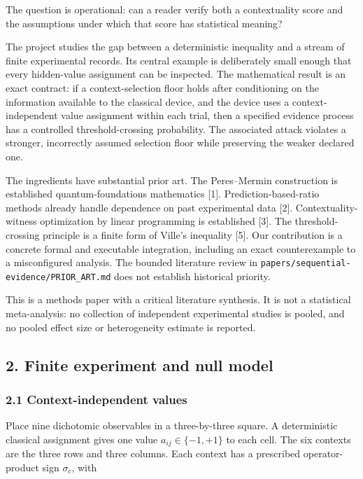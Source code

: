 \documentclass[10pt,a4paper]{article}
\begin{document}
The question is operational: can a reader verify both a contextuality
score and the assumptions under which that score has statistical
meaning?

The project studies the gap between a deterministic inequality and a
stream of finite experimental records. Its central example is
deliberately small enough that every hidden-value assignment can be
inspected. The mathematical result is an exact contract: if a
context-selection floor holds after conditioning on the information
available to the classical device, and the device uses a
context-independent value assignment within each trial, then a specified
evidence process has a controlled threshold-crossing probability. The
associated attack violates a stronger, incorrectly assumed selection
floor while preserving the weaker declared one.

The ingredients have substantial prior art. The Peres--Mermin
construction is established quantum-foundations mathematics {[}1{]}.
Prediction-based-ratio methods already handle dependence on past
experimental data {[}2{]}. Contextuality-witness optimization by linear
programming is established {[}3{]}. The threshold-crossing principle is
a finite form of Ville's inequality {[}5{]}. Our contribution is a
concrete formal and executable integration, including an exact
counterexample to a misconfigured analysis. The bounded literature
review in \texttt{papers/sequential-evidence/PRIOR\_ART.md} does not establish historical
priority.

This is a methods paper with a critical literature synthesis. It is not
a statistical meta-analysis: no collection of independent experimental
studies is pooled, and no pooled effect size or heterogeneity estimate
is reported.

\subsection{2. Finite experiment and null
model}\label{finite-experiment-and-null-model}

\subsubsection{2.1 Context-independent
values}\label{context-independent-values}

Place nine dichotomic observables in a three-by-three square. A
deterministic classical assignment gives one value
\(a_{ij}\in\{-1,+1\}\) to each cell. The six contexts are the three rows
and three columns. Each context has a prescribed operator-product sign
\(\sigma_c\), with
\end{document}
